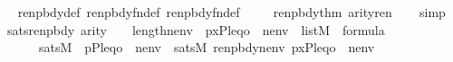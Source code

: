 \begin{isabellebody}
%
\isadelimproof
\ \ %
\endisadelimproof
%
\isatagproof
{}\isamarkupfalse%
\ renpbdy{\isacharunderscore}{\kern0pt}def\ renpbdy{\isacharunderscore}{\kern0pt}fn{\isacharunderscore}{\kern0pt}def\ renpbdy{}{\isacharunderscore}{\kern0pt}fn{\isacharunderscore}{\kern0pt}def\isanewline
\ \ \isamarkupfalse%
\ \ renpbdy{}{\isacharunderscore}{\kern0pt}thm{\isacharparenleft}{\kern0pt}{}{\isacharparenright}{\kern0pt}\ arity{\isacharunderscore}{\kern0pt}ren\isanewline
\ \ \isamarkupfalse%
\ simp%
\endisatagproof
{\isafoldproof}%
%
\isadelimproof
\isanewline
%
\endisadelimproof
\isanewline
{}\isamarkupfalse%
\isanewline
\ \ sats{\isacharunderscore}{\kern0pt}renpbdy{\isacharcolon}{\kern0pt}\ {\isachardoublequoteopen}arity{\isacharparenleft}{\kern0pt}{\isasymphi}{\isacharparenright}{\kern0pt}\ {\isasymle}\ {}\ {\isacharhash}{\kern0pt}{\isacharplus}{\kern0pt}\ length{\isacharparenleft}{\kern0pt}nenv{\isacharparenright}{\kern0pt}\ {\isasymLongrightarrow}\ {\isacharbrackleft}{\kern0pt}{\isasymrho}{\isacharcomma}{\kern0pt}p{\isacharcomma}{\kern0pt}x{\isacharcomma}{\kern0pt}{\isasymalpha}{\isacharcomma}{\kern0pt}P{\isacharcomma}{\kern0pt}leq{\isacharcomma}{\kern0pt}o{\isacharcomma}{\kern0pt}{\isasympi}{\isacharbrackright}{\kern0pt}\ {\isacharat}{\kern0pt}\ nenv\ {\isasymin}\ list{\isacharparenleft}{\kern0pt}M{\isacharparenright}{\kern0pt}\ {\isasymLongrightarrow}\ {\isasymphi}{\isasymin}formula\ {\isasymLongrightarrow}\isanewline
\ \ \ \ \ \ \ sats{\isacharparenleft}{\kern0pt}M{\isacharcomma}{\kern0pt}\ {\isasymphi}{\isacharcomma}{\kern0pt}\ {\isacharbrackleft}{\kern0pt}{\isasymrho}{\isacharcomma}{\kern0pt}p{\isacharcomma}{\kern0pt}{\isasymalpha}{\isacharcomma}{\kern0pt}P{\isacharcomma}{\kern0pt}leq{\isacharcomma}{\kern0pt}o{\isacharbrackright}{\kern0pt}\ {\isacharat}{\kern0pt}\ nenv{\isacharparenright}{\kern0pt}\ {\isasymlongleftrightarrow}\ sats{\isacharparenleft}{\kern0pt}M{\isacharcomma}{\kern0pt}\ renpbdy{\isacharparenleft}{\kern0pt}{\isasymphi}{\isacharcomma}{\kern0pt}nenv{\isacharparenright}{\kern0pt}{\isacharcomma}{\kern0pt}\ {\isacharbrackleft}{\kern0pt}{\isasymrho}{\isacharcomma}{\kern0pt}p{\isacharcomma}{\kern0pt}x{\isacharcomma}{\kern0pt}{\isasymalpha}{\isacharcomma}{\kern0pt}P{\isacharcomma}{\kern0pt}leq{\isacharcomma}{\kern0pt}o{\isacharbrackright}{\kern0pt}\ {\isacharat}{\kern0pt}\ nenv{\isacharparenright}{\kern0pt}{\isachardoublequoteclose}\isanewline
%
\isadelimproof
\ \ %
\endisadelimproof
%
\isatagproof
{}\isamarkupfalse%

\end{isabellebody}
